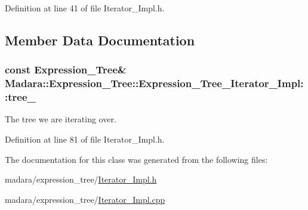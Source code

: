 Definition at line 41 of file Iterator\_\-Impl.h.



\subsection{Member Data Documentation}
\hypertarget{classMadara_1_1Expression__Tree_1_1Expression__Tree__Iterator__Impl_a4b369e3fcfc62405321ece1d46719f93}{
\subsubsection[{tree\_\-}]{\setlength{\rightskip}{0pt plus 5cm}const {\bf Expression\_\-Tree}\& {\bf Madara::Expression\_\-Tree::Expression\_\-Tree\_\-Iterator\_\-Impl::tree\_\-}}}
\label{d0/dd7/classMadara_1_1Expression__Tree_1_1Expression__Tree__Iterator__Impl_a4b369e3fcfc62405321ece1d46719f93}


The tree we are iterating over. 



Definition at line 81 of file Iterator\_\-Impl.h.



The documentation for this class was generated from the following files:\begin{DoxyCompactItemize}
\item 
madara/expression\_\-tree/\hyperlink{Iterator__Impl_8h}{Iterator\_\-Impl.h}\item 
madara/expression\_\-tree/\hyperlink{Iterator__Impl_8cpp}{Iterator\_\-Impl.cpp}\end{DoxyCompactItemize}
